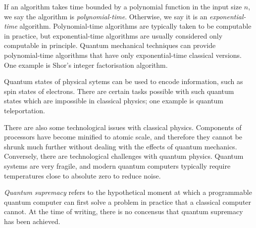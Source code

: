 If an algorithm takes time bounded by a polynomial function in the input size \( n \), we say the algorithm is \emph{polynomial-time}.
Otherwise, we say it is an \emph{exponential-time} algorithm.
Polynomial-time algorithms are typically taken to be computable in practice, but exponential-time algorithms are usually considered only computable in principle.
Quantum mechanical techniques can provide polynomial-time algorithms that have only exponential-time classical versions.
One example is Shor's integer factorisation algorithm.

Quantum states of physical sytems can be used to encode information, such as spin states of electrons.
There are certain tasks possible with such quantum states which are impossible in classical physics; one example is quantum teleportation.

There are also some technological issues with classical physics.
Components of processors have become minified to atomic scale, and therefore they cannot be shrunk much further without dealing with the effects of quantum mechanics.
Conversely, there are technological challenges with quantum physics.
Quantum systems are very fragile, and modern quantum computers typically require temperatures close to absolute zero to reduce noise.

\emph{Quantum supremacy} refers to the hypothetical moment at which a programmable quantum computer can first solve a problem in practice that a classical computer cannot.
At the time of writing, there is no concensus that quantum supremacy has been achieved.

